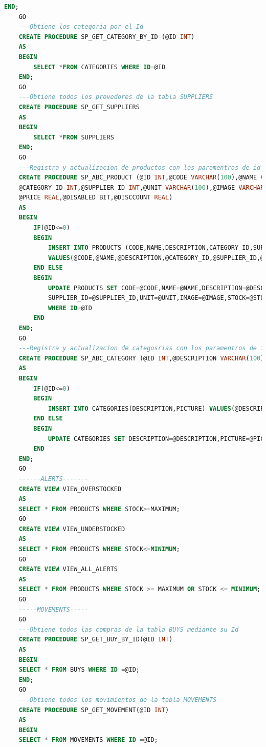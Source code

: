\documentclass[a4paper,DIV=12]{scrreprt}
\begin{document}
\begin{lstlisting}[language={SQL}]
    END;
    GO
    ---Obtiene los categoria por el Id 
    CREATE PROCEDURE SP_GET_CATEGORY_BY_ID (@ID INT)
    AS
    BEGIN
        SELECT *FROM CATEGORIES WHERE ID=@ID
    END;
    GO
    ---Obtiene todos los provedores de la tabla SUPPLIERS
    CREATE PROCEDURE SP_GET_SUPPLIERS
    AS
    BEGIN
        SELECT *FROM SUPPLIERS
    END;
    GO
    ---Registra y actualizacion de productos con los paramentros de id en caso de actulizar,codigo,nombre,etc...
    CREATE PROCEDURE SP_ABC_PRODUCT (@ID INT,@CODE VARCHAR(100),@NAME VARCHAR(100),@DESCRIPTION VARCHAR(MAX),
    @CATEGORY_ID INT,@SUPPLIER_ID INT,@UNIT VARCHAR(100),@IMAGE VARCHAR(MAX),@STOCK REAL,@MINIMUM REAL,@MAXIMUM REAL,
    @PRICE REAL,@DISABLED BIT,@DISCCOUNT REAL)
    AS
    BEGIN
        IF(@ID<=0)
        BEGIN
            INSERT INTO PRODUCTS (CODE,NAME,DESCRIPTION,CATEGORY_ID,SUPPLIER_ID,UNIT,IMAGE,STOCK,MINIMUM,MAXIMUM,PRICE,DISABLED,DISCCOUNT)
            VALUES(@CODE,@NAME,@DESCRIPTION,@CATEGORY_ID,@SUPPLIER_ID,@UNIT,@IMAGE,@STOCK,@MINIMUM,@MAXIMUM,@PRICE,@DISABLED,@DISCCOUNT)
        END ELSE
        BEGIN
            UPDATE PRODUCTS SET CODE=@CODE,NAME=@NAME,DESCRIPTION=@DESCRIPTION,CATEGORY_ID=@CATEGORY_ID,
            SUPPLIER_ID=@SUPPLIER_ID,UNIT=@UNIT,IMAGE=@IMAGE,STOCK=@STOCK,MINIMUM=@MINIMUM,MAXIMUM=@MAXIMUM,PRICE=@PRICE,DISABLED=@DISABLED,DISCCOUNT=@DISCCOUNT
            WHERE ID=@ID
        END
    END;
    GO
    ---Registra y actualizacion de categosrias con los paramentros de id en caso de actulizar,descripción e imagen
    CREATE PROCEDURE SP_ABC_CATEGORY (@ID INT,@DESCRIPTION VARCHAR(100),@PICTURE VARCHAR(MAX))
    AS
    BEGIN
        IF(@ID<=0)
        BEGIN
            INSERT INTO CATEGORIES(DESCRIPTION,PICTURE) VALUES(@DESCRIPTION,@PICTURE) 
        END ELSE
        BEGIN
            UPDATE CATEGORIES SET DESCRIPTION=@DESCRIPTION,PICTURE=@PICTURE WHERE ID=@ID
        END
    END;
    GO
    ------ALERTS-------
    CREATE VIEW VIEW_OVERSTOCKED
    AS
    SELECT * FROM PRODUCTS WHERE STOCK>=MAXIMUM;
    GO
    CREATE VIEW VIEW_UNDERSTOCKED
    AS
    SELECT * FROM PRODUCTS WHERE STOCK<=MINIMUM;
    GO
    CREATE VIEW VIEW_ALL_ALERTS
    AS
    SELECT * FROM PRODUCTS WHERE STOCK >= MAXIMUM OR STOCK <= MINIMUM;
    GO
    -----MOVEMENTS-----
    GO
    ---Obtiene todos las compras de la tabla BUYS mediante su Id
    CREATE PROCEDURE SP_GET_BUY_BY_ID(@ID INT)
    AS
    BEGIN
    SELECT * FROM BUYS WHERE ID =@ID;
    END;
    GO
    ---Obtiene todos los movimientos de la tabla MOVEMENTS
    CREATE PROCEDURE SP_GET_MOVEMENT(@ID INT)
    AS
    BEGIN
    SELECT * FROM MOVEMENTS WHERE ID =@ID;

\end{lstlisting}
\end{document}
